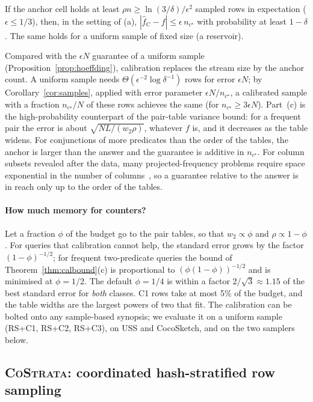 \documentclass[sigconf]{acmart}
\newcommand{\cs}{\textsc{CoStrata}\xspace}
\begin{document}
\begin{corollary}\label{cor:samples}
If the anchor cell holds at least $\rho n\ge \ln(3/\delta)/\epsilon^2$ sampled rows in expectation
($\epsilon\le1/3$), then, in the setting of (a), $|\hat f_{\mathrm C}-f|\le\epsilon\, n_{c^\star}$ with
probability at least $1-\delta$. The same holds for a uniform sample of fixed size (a reservoir).
\end{corollary}

Compared with the $\epsilon N$ guarantee of a uniform sample (Proposition~\ref{prop:hoeffding}),
calibration replaces the stream size by the anchor count. A uniform sample needs
$\Theta(\epsilon^{-2}\log\delta^{-1})$ rows for error $\epsilon N$; by Corollary~\ref{cor:samples}, applied
with error parameter $\epsilon N/n_{c^\star}$, a calibrated sample with a fraction $n_{c^\star}/N$ of these
rows achieves the same (for $n_{c^\star}\ge3\epsilon N$). Part~(c) is the high-probability counterpart of the pair-table
variance bound: for a frequent pair the error is about $\sqrt{N L/(w_2\rho)}$, whatever $f$ is, and it
decreases as the table widens. For conjunctions of more predicates than the order of the tables, the
anchor is larger than the answer and the guarantee is additive in $n_{c^\star}$. For column subsets
revealed after the data, many projected-frequency problems require space exponential in the number of
columns~\cite{projfreq}, so a guarantee relative to the answer is in reach only up to the order of the
tables.

\paragraph{How much memory for counters?} Let a fraction $\phi$ of the budget go to the pair tables,
so that $w_2\propto\phi$ and $\rho\propto1-\phi$. For queries that calibration cannot help, the
standard error grows by the factor $(1-\phi)^{-1/2}$; for frequent two-predicate queries the bound of
Theorem~\ref{thm:calbound}(c) is proportional to $(\phi(1-\phi))^{-1/2}$ and is minimised at $\phi=1/2$.
The default $\phi=1/4$ is within a factor $2/\sqrt3\approx1.15$ of the best standard error for \emph{both}
classes. C1 rows take at most 5\% of the budget, and the table widths are the largest powers of two that
fit. The calibration can be bolted onto any sample-based synopsis; we evaluate it on a uniform sample
(\textsc{RS+C1}, \textsc{RS+C2}, \textsc{RS+C3}), on USS and CocoSketch, and on the two samplers below.

\subsection{\cs: coordinated hash-stratified row sampling}\label{sec:costrata}
\end{document}
